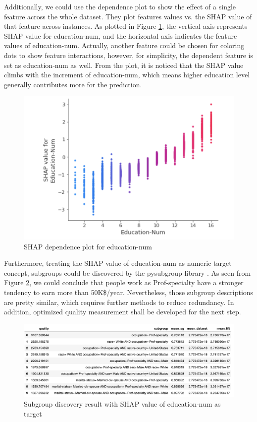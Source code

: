 \documentclass[runningheads]{llncs}
\begin{document}
	Additionally, we could use the dependence plot to show the effect of a single feature across the whole dataset. They plot feature\textquotesingle s values vs. the SHAP value of that feature across instances. As plotted in Figure \ref{fig:edu_dependence}, the vertical axis represents SHAP value for education-num, and the horizontal axis indicates the feature values of education-num. Actually, another feature could be chosen for coloring dots to show feature interactions, however, for simplicity, the dependent feature is set as education-num as well. From the plot, it is noticed that the SHAP value climbs with the increment of education-num, which means higher education level generally contributes more for the prediction.
	
	\begin{figure}
		\centering
		\includegraphics[width=1.0\textwidth]{img/education_dependence_plot.png}
		\caption{SHAP dependence plot for education-num}
		\label{fig:edu_dependence}
	\end{figure}

    Furthermore, treating the SHAP value of education-num as numeric target concept, subgroups could be discovered by the pysubgroup library \cite{lemmerich2018pysubgroup}. As seen from Figure \ref{fig:edu_sg_discovery}, we could conclude that people work as Prof-specialty have a stronger tendency to earn more than 50K\$/year. Nevertheless, those subgroup descriptions are pretty similar, which requires further methods to reduce redundancy. In addition, optimized quality measurement shall be developed for the next step.

	\begin{figure}
		\centering
		\includegraphics[width=1.2\textwidth]{img/edu_sg_discovery.png}
		\caption{Subgroup discovery result with SHAP value of education-num as target}
		\label{fig:edu_sg_discovery}
	\end{figure}
\end{document}
